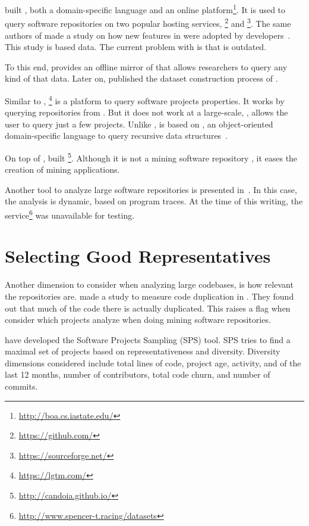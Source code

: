 \documentclass{usiinfdocprop}
\begin{document}
\cite{dyer_boa:_2013,dyer_declarative_2013} built \boa{}, both a domain-specific language and an online platform\footnote{\url{http://boa.cs.iastate.edu/}}.
It is used to query software repositories on two popular hosting services, \github \footnote{\url{https://github.com/}} and \sourceforge \footnote{\url{https://sourceforge.net/}}.
The same authors of \boa{} made a study on how new features in \java{} were adopted by developers~\cite{dyer_mining_2014}.
This study is based \sourceforge{} data.
The current problem with \sourceforge{} is that is outdated.

To this end, \cite{gousios_ghtorent_2013} provides an offline mirror of \github{} that allows researchers to query any kind of that data.
Later on, \cite{gousios_lean_2014} published the dataset construction process of \github{}.

Similar to \boa{}, \lgtm \footnote{\url{https://lgtm.com/}} is a platform to query software projects properties.
It works by querying repositories from \github{}.
But it does not work at a large-scale, \ie{}, \lgtm{} allows the user to query just a few projects.
Unlike \boa{}, \lgtm{} is based on \ql{}, an object-oriented domain-specific language to query recursive data structures~\cite{avgustinov_ql:_2016}.

On top of \boa{}, \cite{tiwari_candoia:_2017} built \candoia \footnote{\url{http://candoia.github.io/}}.
Although it is not a mining software repository \perse{}, it eases the creation of mining applications.

Another tool to analyze large software repositories is presented in~\cite{brandauer_spencer:_2017}.
In this case, the analysis is dynamic, based on program traces.
At the time of this writing, the service\footnote{\url{http://www.spencer-t.racing/datasets}} was unavailable for testing.

\section{Selecting Good Representatives \label{orgc8f89c6}}
\label{sec:orgada6646}
Another dimension to consider when analyzing large codebases, is how relevant the repositories are.
\cite{lopes_dejavu:_2017} made a study to measure code duplication in \github{}.
They found out that much of the code there is actually duplicated.
This raises a flag when consider which projects analyze when doing mining software repositories. 

\cite{nagappan_diversity_2013} have developed the Software Projects Sampling (SPS) tool.
SPS tries to find a maximal set of projects based on representativeness and diversity.
Diversity dimensions considered include total lines of code, project age, activity, and of the last 12 months, number of contributors, total code churn, and number of commits.
\end{document}

